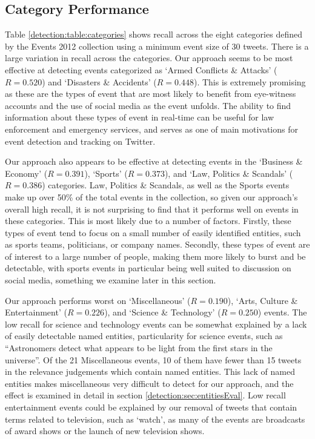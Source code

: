 \subsection{Category Performance}
Table \ref{detection:table:categories} shows recall across the eight categories defined by the Events 2012 collection using a minimum event size of 30 tweets.
There is a large variation in recall across the categories.
Our approach seems to be most effective at detecting events categorized as  `Armed Conflicts \& Attacks' ($R=0.520$) and `Disasters \& Accidents' ($R=0.448$).
This is extremely promising as these are the types of event that are most likely to benefit from eye-witness accounts and the use of social media as the event unfolds.
The ability to find information about these types of event in real-time can be useful for law enforcement and emergency services, and serves as one of main motivations for event detection and tracking on Twitter.

Our approach also appears to be effective at detecting events in the `Business \& Economy' ($R=0.391$), `Sports' ($R=0.373$), and `Law, Politics \& Scandals' ($R=0.386$) categories.
Law, Politics \& Scandals, as well as the Sports events make up over 50\% of the total events in the collection, so given our approach's overall high recall, it is not surprising to find that it performs well on events in these categories.
This is most likely due to a number of factors. Firstly, these types of event tend to focus on a small number of easily identified entities, such as sports teams, politicians, or company names.
Secondly, these types of event are of interest to a large number of people, making them more likely to burst and be detectable, with sports events in particular being well suited to discussion on social media, something we examine later in this section.

Our approach performs worst on `Miscellaneous' ($R=0.190$), `Arts, Culture \& Entertainment' ($R=0.226$), and `Science \& Technology' ($R=0.250$) events.
The low recall for science and technology events can be somewhat explained by a lack of easily detectable named entities, particularity for science events, such as ``Astronomers detect what appears to be light from the first stars in the universe''. Of the 21 Miscellaneous events, 10 of them have fewer than 15 tweets in the relevance judgements which contain named entities.
This lack of named entities makes miscellaneous very difficult to detect for our approach, and the effect is examined in detail in section \ref{detection:sec:entitiesEval}.
Low recall entertainment events could be explained by our removal of tweets that contain terms related to television, such as `watch', as many of the events are broadcasts of award shows or the launch of new television shows.

